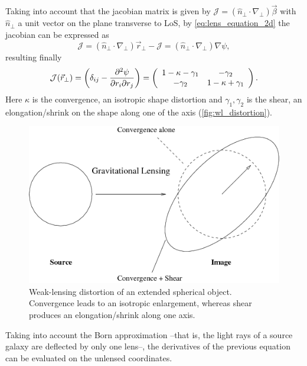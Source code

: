 Taking into account that the jacobian matrix is given by $\mathcal{J}=(\hat n_\perp\cdot\nabla_\perp)\vec\beta$ with $\hat n_\perp$ a unit vector on the plane transverse to LoS, by \autoref{eq:lens_equation_2d} the jacobian can be expressed as
\begin{equation}
\mathcal{J} = (\hat n_\perp\cdot\nabla_\perp)\vec r_\perp-\mathcal{J} = (\hat n_\perp\cdot\nabla_\perp)\nabla\psi,
\end{equation}
resulting finally 
\begin{equation}
\mathcal{J}(\vec r_\perp) = \left(\delta_{ij}-\frac{\partial^2\psi}{\partial r_i\partial r_j}\right)=\left( \begin{array}{c c}1-\kappa-\gamma_1 & -\gamma_2\\-\gamma_2 & 1-\kappa+\gamma_1\end{array} \right).
\label{eq:jacobian}
\end{equation}
Here $\kappa$ is the convergence, an isotropic shape distortion and $\gamma_1,\gamma_2$ is the shear, an elongation/shrink on the shape along one of the axis (\autoref{fig:wl_distortion}).
\begin{figure}
\includegraphics[width=\textwidth]{./Pictures/distortion.png}
\caption{Weak-lensing distortion of an extended spherical object. Convergence leads to an isotropic enlargement, whereas shear produces an elongation/shrink along one axis.}
\label{fig:wl_distortion}
\end{figure}

Taking into account the Born approximation --that is, the light rays of a source galaxy are deflected by only one lens--, the derivatives of the previous equation can be evaluated on the unlensed coordinates.

